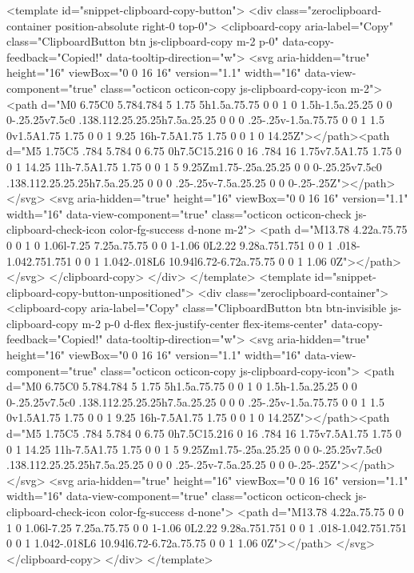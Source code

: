 {{{{{{{    <template id="snippet-clipboard-copy-button">
  <div class="zeroclipboard-container position-absolute right-0 top-0">
    <clipboard-copy aria-label="Copy" class="ClipboardButton btn js-clipboard-copy m-2 p-0" data-copy-feedback="Copied!" data-tooltip-direction="w">
      <svg aria-hidden="true" height="16" viewBox="0 0 16 16" version="1.1" width="16" data-view-component="true" class="octicon octicon-copy js-clipboard-copy-icon m-2">
    <path d="M0 6.75C0 5.784.784 5 1.75 5h1.5a.75.75 0 0 1 0 1.5h-1.5a.25.25 0 0 0-.25.25v7.5c0 .138.112.25.25.25h7.5a.25.25 0 0 0 .25-.25v-1.5a.75.75 0 0 1 1.5 0v1.5A1.75 1.75 0 0 1 9.25 16h-7.5A1.75 1.75 0 0 1 0 14.25Z"></path><path d="M5 1.75C5 .784 5.784 0 6.75 0h7.5C15.216 0 16 .784 16 1.75v7.5A1.75 1.75 0 0 1 14.25 11h-7.5A1.75 1.75 0 0 1 5 9.25Zm1.75-.25a.25.25 0 0 0-.25.25v7.5c0 .138.112.25.25.25h7.5a.25.25 0 0 0 .25-.25v-7.5a.25.25 0 0 0-.25-.25Z"></path>
</svg>
      <svg aria-hidden="true" height="16" viewBox="0 0 16 16" version="1.1" width="16" data-view-component="true" class="octicon octicon-check js-clipboard-check-icon color-fg-success d-none m-2">
    <path d="M13.78 4.22a.75.75 0 0 1 0 1.06l-7.25 7.25a.75.75 0 0 1-1.06 0L2.22 9.28a.751.751 0 0 1 .018-1.042.751.751 0 0 1 1.042-.018L6 10.94l6.72-6.72a.75.75 0 0 1 1.06 0Z"></path>
</svg>
    </clipboard-copy>
  </div>
</template>
<template id="snippet-clipboard-copy-button-unpositioned">
  <div class="zeroclipboard-container">
    <clipboard-copy aria-label="Copy" class="ClipboardButton btn btn-invisible js-clipboard-copy m-2 p-0 d-flex flex-justify-center flex-items-center" data-copy-feedback="Copied!" data-tooltip-direction="w">
      <svg aria-hidden="true" height="16" viewBox="0 0 16 16" version="1.1" width="16" data-view-component="true" class="octicon octicon-copy js-clipboard-copy-icon">
    <path d="M0 6.75C0 5.784.784 5 1.75 5h1.5a.75.75 0 0 1 0 1.5h-1.5a.25.25 0 0 0-.25.25v7.5c0 .138.112.25.25.25h7.5a.25.25 0 0 0 .25-.25v-1.5a.75.75 0 0 1 1.5 0v1.5A1.75 1.75 0 0 1 9.25 16h-7.5A1.75 1.75 0 0 1 0 14.25Z"></path><path d="M5 1.75C5 .784 5.784 0 6.75 0h7.5C15.216 0 16 .784 16 1.75v7.5A1.75 1.75 0 0 1 14.25 11h-7.5A1.75 1.75 0 0 1 5 9.25Zm1.75-.25a.25.25 0 0 0-.25.25v7.5c0 .138.112.25.25.25h7.5a.25.25 0 0 0 .25-.25v-7.5a.25.25 0 0 0-.25-.25Z"></path>
</svg>
      <svg aria-hidden="true" height="16" viewBox="0 0 16 16" version="1.1" width="16" data-view-component="true" class="octicon octicon-check js-clipboard-check-icon color-fg-success d-none">
    <path d="M13.78 4.22a.75.75 0 0 1 0 1.06l-7.25 7.25a.75.75 0 0 1-1.06 0L2.22 9.28a.751.751 0 0 1 .018-1.042.751.751 0 0 1 1.042-.018L6 10.94l6.72-6.72a.75.75 0 0 1 1.06 0Z"></path>
</svg>
    </clipboard-copy>
  </div>
</template>


}}}}}}}
